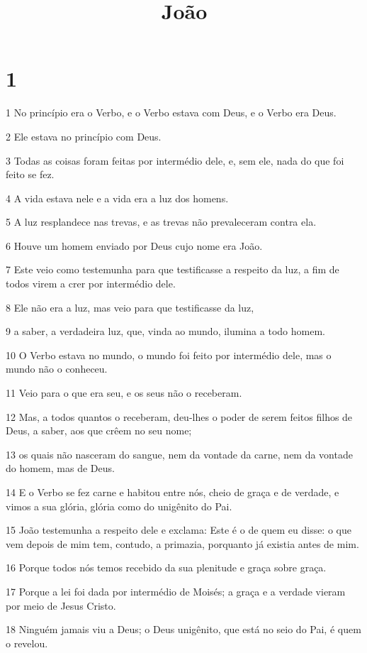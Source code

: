 

\title{João}


\chapter{1}

\par 1 No princípio era o Verbo, e o Verbo estava com Deus, e o Verbo era Deus.
\par 2 Ele estava no princípio com Deus.
\par 3 Todas as coisas foram feitas por intermédio dele, e, sem ele, nada do que foi feito se fez.
\par 4 A vida estava nele e a vida era a luz dos homens.
\par 5 A luz resplandece nas trevas, e as trevas não prevaleceram contra ela.
\par 6 Houve um homem enviado por Deus cujo nome era João.
\par 7 Este veio como testemunha para que testificasse a respeito da luz, a fim de todos virem a crer por intermédio dele.
\par 8 Ele não era a luz, mas veio para que testificasse da luz,
\par 9 a saber, a verdadeira luz, que, vinda ao mundo, ilumina a todo homem.
\par 10 O Verbo estava no mundo, o mundo foi feito por intermédio dele, mas o mundo não o conheceu.
\par 11 Veio para o que era seu, e os seus não o receberam.
\par 12 Mas, a todos quantos o receberam, deu-lhes o poder de serem feitos filhos de Deus, a saber, aos que crêem no seu nome;
\par 13 os quais não nasceram do sangue, nem da vontade da carne, nem da vontade do homem, mas de Deus.
\par 14 E o Verbo se fez carne e habitou entre nós, cheio de graça e de verdade, e vimos a sua glória, glória como do unigênito do Pai.
\par 15 João testemunha a respeito dele e exclama: Este é o de quem eu disse: o que vem depois de mim tem, contudo, a primazia, porquanto já existia antes de mim.
\par 16 Porque todos nós temos recebido da sua plenitude e graça sobre graça.
\par 17 Porque a lei foi dada por intermédio de Moisés; a graça e a verdade vieram por meio de Jesus Cristo.
\par 18 Ninguém jamais viu a Deus; o Deus unigênito, que está no seio do Pai, é quem o revelou.
